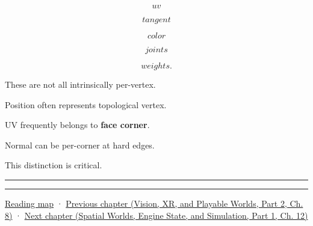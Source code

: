 \[
uv
\]

\[
tangent
\]

\[
color
\]

\[
joints
\]

\[
weights.
\]

These are not all intrinsically per-vertex.

Position often represents topological vertex.

UV frequently belongs to \textbf{face corner}.

Normal can be per-corner at hard edges.

This distinction is critical.

\begin{center}\rule{0.5\linewidth}{0.5pt}\end{center}

\begin{center}\rule{0.5\linewidth}{0.5pt}\end{center}

\hyperref[volume-reading-map]{Reading map} · \href{../07-Vision-XR-and-Playable-Worlds-P02/main.pdf\#04-visual-computing-ii-ch039-tiling-ordering-and-compositing-at-scale}{Previous chapter (Vision, XR, and Playable Worlds, Part 2, Ch. 8)} · \href{../05-Spatial-Worlds-Engine-State-and-Simulation-P01/main.pdf\#04-visual-computing-ii-ch041-per-vertex-and-per-corner-mesh-attributes}{Next chapter (Spatial Worlds, Engine State, and Simulation, Part 1, Ch. 12)}
